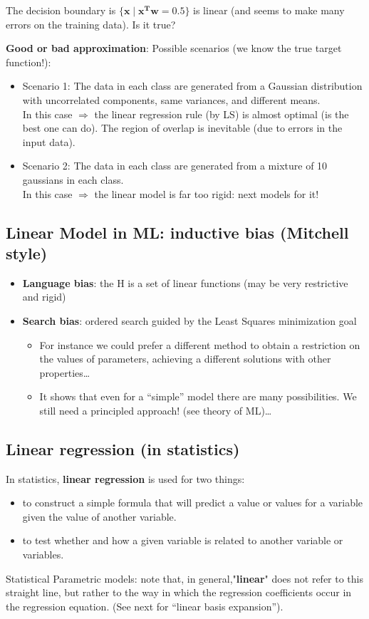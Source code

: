 \documentclass[../main.tex]{subfiles}
\begin{document}
The decision boundary is $\{\mathbf{x} \;|\; \mathbf{x^Tw} = 0.5 \}$ is linear (and seems to make many errors on the training data). Is it true?

\noindent \textbf{Good or bad approximation}:
Possible scenarios (we know the true target function!):
\begin{itemize}
    \item Scenario 1: The data in each class are generated from a Gaussian distribution with uncorrelated components, same variances, and different means.\\
    In this case $\Rightarrow$ the linear regression rule (by LS) is almost optimal (is the best one can do). The region of overlap is inevitable (due to errors in the input data). 
    \item Scenario 2: The data in each class are generated from a mixture of 10 gaussians in each class.\\
     In this case  $\Rightarrow$ the linear model is far too rigid: next models for it!
\end{itemize}

\subsection{Linear Model in ML: inductive bias (Mitchell style)}%
\begin{itemize}
    \item \textbf{Language bias}: the H is a set of linear functions (may be very restrictive and rigid)
    \item  \textbf{Search bias}: ordered search guided by the Least Squares minimization goal
	\begin{itemize}
	    \item For instance we could prefer a different method to obtain a restriction on the values of parameters, achieving a different solutions with other properties…
	    \item It shows that even for a “simple” model there are many possibilities.  We still need a principled approach! (see theory of ML)…
	\end{itemize}
\end{itemize}

\subsection{Linear regression (in statistics)}
In statistics, \textbf{linear regression} is used for two things:
\begin{itemize}
    \item to construct a simple formula that will predict a value or values for a variable
given the value of another variable.
    \item to test whether and how a given variable is related to another variable or variables.
\end{itemize}
Statistical Parametric models: note that, in general,"\textbf{linear}" does not refer to this straight line, but rather to the way in which the regression coefficients occur in the regression equation. (See next for “linear basis expansion”).
\end{document}
